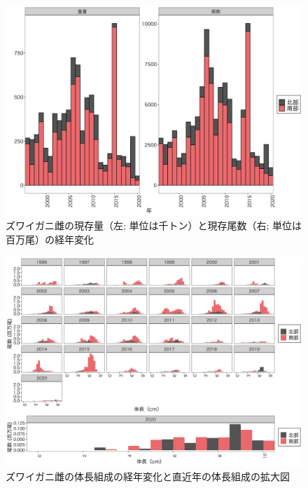 \documentclass[11pt]{article} %
\begin{document}
\begin{linenumbers}
\begin{figure}[h]
  \centering
  \includegraphics[width = 14cm]{ズワイガニ雌trend.png}
  \caption{ズワイガニ雌の現存量（左; 単位は千トン）と現存尾数（右; 単位は百万尾）の経年変化}
\end{figure}

\begin{figure}[h]
  \centering
  \includegraphics[width = 14cm]{ズワイガニ雌length.png}
  \caption{ズワイガニ雌の体長組成の経年変化と直近年の体長組成の拡大図}
\end{figure}


\end{linenumbers}
\end{document}
